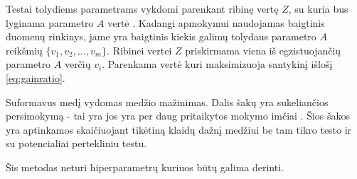  Testai tolydiems parametrams vykdomi parenkant ribinę vertę $Z$, su kuria bus lyginama parametro $A$ vertė \cite{c45}. Kadangi apmokymui naudojamas baigtinis duomenų rinkinys, jame yra baigtinis kiekis galimų tolydaus parametro $A$ reikšmių $\{v_1, v_2, ..., v_m\}$. Ribinei vertei $Z$ priskirmama viena iš egzistuojančių parametro $A$ verčių  $v_i$. Parenkama vertė kuri maksimizuoja santykinį išlošį \ref{eq:gainratio}.

Suformavus medį vydomas medžio mažinimas. Dalis šakų yra sukeliančios persimokymą - tai yra jos yra per daug pritaikytos mokymo imčiai \cite{c45}. Šios šakos yra aptinkamos skaičiuojant tikėtiną klaidų dažnį medžiui be tam tikro testo ir su potencialiai pertekliniu testu.

Šis metodas neturi hiperparametrų kuriuos būtų galima derinti.